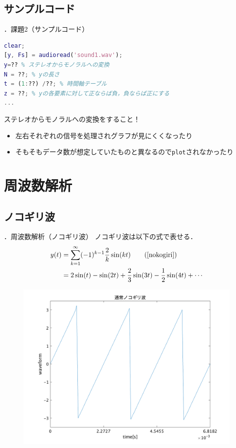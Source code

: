\documentclass[aspectratio=43]{beamer}
\newcommand{\showsec}{\thesection ．}
\begin{document}
\subsection{サンプルコード}
\begin{frame}[t,containsverbatim]{\showsec 課題2（サンプルコード）}
    \begin{lstlisting}[language={Matlab}]
clear;
[y, Fs] = audioread('sound1.wav');
y=?? % ステレオからモノラルへの変換
N = ??; % yの長さ
t = (1:??) /??; % 時間軸テーブル
z = ??; % yの各要素に対して正ならば負，負ならば正にする
...
    \end{lstlisting}
    \begin{alertblock}{}
        ステレオからモノラルへの変換をすること！
        \begin{itemize}
            \item 左右それぞれの信号を処理されグラフが見にくくなったり
            \item そもそもデータ数が想定していたものと異なるので\texttt{plot}されなかったり
        \end{itemize}
    \end{alertblock}
\end{frame}
\section{周波数解析}
\subsection{ノコギリ波}
\begin{frame}[t]{\showsec 周波数解析（ノコギリ波）}
    ノコギリ波は以下の式で表せる．
    \begin{align}
        y(t) & = \sum_{k=1}^{\infty}(-1)^{k-1}\dfrac{2}{k}\sin(kt)\tag{\ref{nokogiri}}    \\
             & = 2\sin(t) - \sin(2t) + \frac{2}{3}\sin(3t) - \frac{1}{2}\sin(4t) + \cdots
    \end{align}
    \begin{figure}
        \includegraphics[keepaspectratio,height=0.5\textheight]{nokogiri.png}
    \end{figure}
\end{frame}
\end{document}
